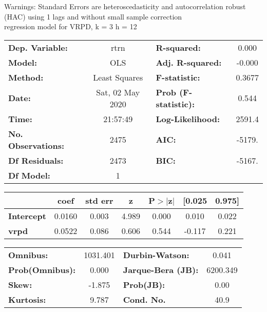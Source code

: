 Warnings: \newline
 [1] Standard Errors are heteroscedasticity and autocorrelation robust (HAC) using 1 lags and without small sample correction\\ 

regression model for VRPD, k = 3 h = 12\begin{center}
\begin{tabular}{lclc}
\toprule
\textbf{Dep. Variable:}    &       rtrn       & \textbf{  R-squared:         } &     0.000   \\
\textbf{Model:}            &       OLS        & \textbf{  Adj. R-squared:    } &    -0.000   \\
\textbf{Method:}           &  Least Squares   & \textbf{  F-statistic:       } &    0.3677   \\
\textbf{Date:}             & Sat, 02 May 2020 & \textbf{  Prob (F-statistic):} &    0.544    \\
\textbf{Time:}             &     21:57:49     & \textbf{  Log-Likelihood:    } &    2591.4   \\
\textbf{No. Observations:} &        2475      & \textbf{  AIC:               } &    -5179.   \\
\textbf{Df Residuals:}     &        2473      & \textbf{  BIC:               } &    -5167.   \\
\textbf{Df Model:}         &           1      & \textbf{                     } &             \\
\bottomrule
\end{tabular}
\begin{tabular}{lcccccc}
                   & \textbf{coef} & \textbf{std err} & \textbf{z} & \textbf{P$> |$z$|$} & \textbf{[0.025} & \textbf{0.975]}  \\
\midrule
\textbf{Intercept} &       0.0160  &        0.003     &     4.989  &         0.000        &        0.010    &        0.022     \\
\textbf{vrpd}      &       0.0522  &        0.086     &     0.606  &         0.544        &       -0.117    &        0.221     \\
\bottomrule
\end{tabular}
\begin{tabular}{lclc}
\textbf{Omnibus:}       & 1031.401 & \textbf{  Durbin-Watson:     } &    0.041  \\
\textbf{Prob(Omnibus):} &   0.000  & \textbf{  Jarque-Bera (JB):  } & 6200.349  \\
\textbf{Skew:}          &  -1.875  & \textbf{  Prob(JB):          } &     0.00  \\
\textbf{Kurtosis:}      &   9.787  & \textbf{  Cond. No.          } &     40.9  \\
\bottomrule
\end{tabular}
\end{center}

